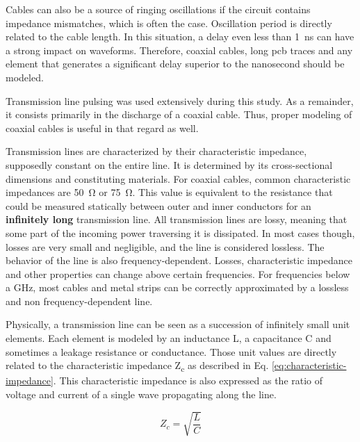 Cables can also be a source of ringing oscillations if the circuit contains impedance mismatches, which is often the case.
Oscillation period is directly related to the cable length.
In this situation, a delay even less than \SI{1}{\nano\second} can have a strong impact on waveforms.
Therefore, coaxial cables, long \gls{pcb} traces and any element that generates a significant delay superior to the nanosecond should be modeled.

Transmission line pulsing was used extensively during this study.
As a remainder, it consists primarily in the discharge of a coaxial cable.
Thus, proper modeling of coaxial cables is useful in that regard as well.

Transmission lines are characterized by their characteristic impedance, supposedly constant on the entire line.
It is determined by its cross-sectional dimensions and constituting materials.
For coaxial cables, common characteristic impedances are \SI{50}{\ohm} or \SI{75}{\ohm}.
This value is equivalent to the resistance that could be measured statically between outer and inner conductors for an \textbf{infinitely long} transmission line.
All transmission lines are lossy, meaning that some part of the incoming power traversing it is dissipated.
In most cases though, losses are very small and negligible, and the line is considered lossless.
The behavior of the line is also frequency-dependent.
Losses, characteristic impedance and other properties can change above certain frequencies.
For frequencies below a GHz, most cables and metal strips can be correctly approximated by a lossless and non frequency-dependent line.

Physically, a transmission line can be seen as a succession of infinitely small unit elements.
Each element is modeled by an inductance L, a capacitance C and sometimes a leakage resistance or conductance.
Those unit values are directly related to the characteristic impedance Z\textsubscript{c} as described in Eq. \ref{eq:characteristic-impedance}.
This characteristic impedance is also expressed as the ratio of voltage and current of a single wave propagating along the line.

\begin{equation}
Z_{c} = \sqrt{\frac{L}{C}}
\label{eq:characteristic-impedance}
\end{equation}

